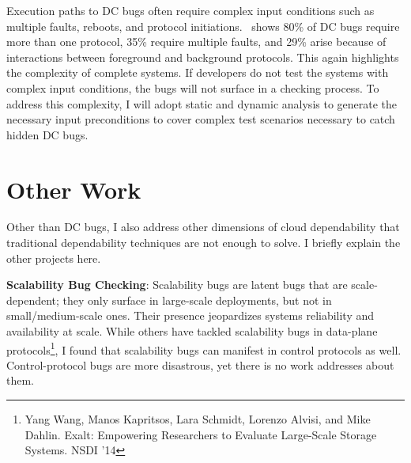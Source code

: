 \documentclass[10pt]{article}
\begin{document}
Execution paths to DC bugs often require complex input conditions such as
multiple faults, reboots, and protocol initiations. \taxdc\ shows 80\% of DC bugs
require more than one protocol, 35\% require multiple faults, and 29\% arise
because of interactions between foreground and background protocols. This again
highlights the complexity of complete systems. 
If developers do not test the systems with complex input conditions, the bugs
will not surface in a checking process. To address this complexity, I will adopt
static and dynamic analysis to generate the necessary input preconditions to
cover complex test scenarios necessary to catch hidden DC bugs.

\section{Other Work}

Other than DC bugs, I also address other dimensions of cloud dependability that
traditional dependability techniques are not enough to solve. I briefly explain
the other projects here.

%


\noindent
\textbf{Scalability Bug Checking}: Scalability bugs are latent bugs that are
scale-dependent; they only surface in large-scale deployments, but not in
small/medium-scale ones. Their presence jeopardizes systems reliability and
availability at scale. 
%
While others have tackled scalability bugs in data-plane protocols\footnote{Yang
Wang, Manos Kapritsos, Lara Schmidt, Lorenzo Alvisi, and Mike Dahlin.
Exalt: Empowering Researchers to Evaluate Large-Scale Storage Systems. NSDI
'14}, I found that scalability bugs can manifest in control protocols as well.
Control-protocol bugs are more disastrous, yet there is no work addresses about
them.
 
\end{document}
